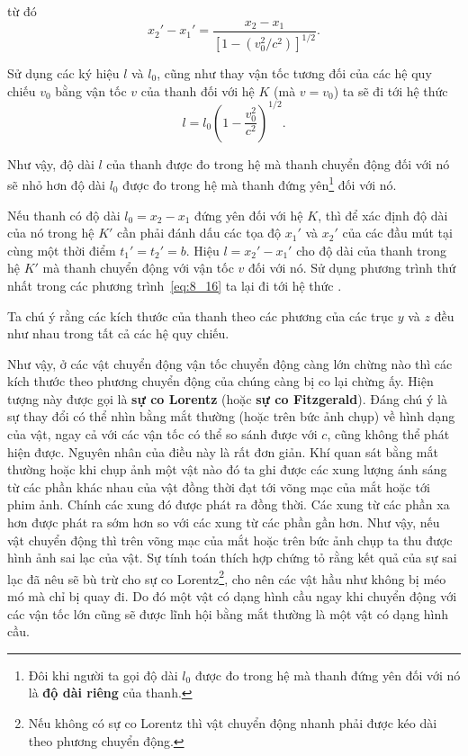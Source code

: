 \noindent
từ đó
\begin{equation*}
	x_2' - x_1' = \frac{x_2 - x_1}{\left[1 - \left(v_0^2/c^2\right)\right]^{1/2}}.
\end{equation*}

\noindent
Sử dụng các ký hiệu $l$ và $l_0$, cũng như thay vận tốc tương đối của các hệ quy chiếu $v_0$ bằng vận tốc $v$ của thanh đối với hệ $K$ (mà $v=v_0$) ta sẽ đi tới hệ thức
\begin{equation}\label{eq:8_19}
	l = l_0 \left(1 - \frac{v_0^2}{c^2}\right)^{1/2}.
\end{equation}

\noindent
Như vậy, độ dài $l$ của thanh được đo trong hệ mà thanh chuyển động đối với nó sẽ nhỏ hơn độ dài $l_0$ được đo trong hệ mà thanh đứng yên\footnote{Đôi khi người ta gọi độ dài $l_0$ được đo trong hệ mà thanh đứng yên đối với nó là \textbf{độ dài riêng} của thanh.} đối với nó.

Nếu thanh có độ dài $l_0=x_2-x_1$ đứng yên đối với hệ $K$, thì để xác định độ dài của nó trong hệ $K'$ cần phải đánh dấu các tọa độ $x_1'$ và $x_2'$ của các đầu mút tại cùng một thời điểm $t_1'=t_2'=b$. Hiệu $l=x_2'-x_1'$ cho độ dài của thanh trong hệ $K'$ mà thanh chuyển động với vận tốc $v$ đối với nó. Sử dụng phương trình thứ nhất trong các phương trình~\eqref{eq:8_16} ta lại đi tới hệ thức .

Ta chú ý rằng các kích thước của thanh theo các phương của các trục $y$ và $z$ đều như nhau trong tất cả các hệ quy chiếu.

Như vậy, ở các vật chuyển động vận tốc chuyển động càng lớn chừng nào thì các kích thước theo phương chuyển động của chúng càng bị co lại chừng ấy. Hiện tượng này được gọi là \textbf{sự co Lorentz} (hoặc \textbf{sự co Fitzgerald}). Đáng chú ý là sự thay đổi có thể nhìn bằng mắt thường (hoặc trên bức ảnh chụp) về hình dạng của vật, ngay cả với các vận tốc có thể so sánh được với $c$, cũng không thể phát hiện được. Nguyên nhân của điều này là rất đơn giản. Khí quan sát bằng mắt thường hoặc khi chụp ảnh một vật nào đó ta ghi được các xung lượng ánh sáng từ các phần khác nhau của vật đồng thời đạt tới võng mạc của mắt hoặc tới phim ảnh. Chính các xung đó được phát ra đồng thời. Các xung từ các phần xa hơn được phát ra sớm hơn so với các xung từ các phần gần hơn. Như vậy, nếu vật chuyển động thì trên võng mạc của mắt hoặc trên bức ảnh chụp ta thu được hình ảnh sai lạc của vật. Sự tính toán thích hợp chứng tỏ rằng kết quả của sự sai lạc đã nêu sẽ bù trừ cho sự co Lorentz\footnote{Nếu không có sự co Lorentz thì vật chuyển động nhanh phải được kéo dài theo phương chuyển động.}, cho nên các vật hầu như không bị méo mó mà chỉ bị quay đi. Do đó một vật có dạng hình cầu ngay khi chuyển động với các vận tốc lớn cũng sẽ được lĩnh hội bằng mắt thường là một vật có dạng hình cầu.

